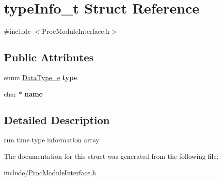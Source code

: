 \hypertarget{structtypeInfo__t}{}\section{type\+Info\+\_\+t Struct Reference}
\label{structtypeInfo__t}


{\ttfamily \#include $<$Proc\+Module\+Interface.\+h$>$}

\subsection*{Public Attributes}
\begin{DoxyCompactItemize}
\item 
\mbox{\label{structtypeInfo__t_a72f596d50fbed6d20b2bc93d2ca19c32}} 
enum \hyperlink{ProcModuleInterface_8h_a7f744a63aa1123dec31fc2bc47cf8ba8}{Data\+Type\+\_\+e} {\bfseries type}
\item 
\mbox{\label{structtypeInfo__t_ac05158f38e7e4e3e2b9c55ef1605dec9}} 
char $\ast$ {\bfseries name}
\end{DoxyCompactItemize}


\subsection{Detailed Description}
run time type information array 

The documentation for this struct was generated from the following file\+:\begin{DoxyCompactItemize}
\item 
include/\hyperlink{ProcModuleInterface_8h}{Proc\+Module\+Interface.\+h}\end{DoxyCompactItemize}
